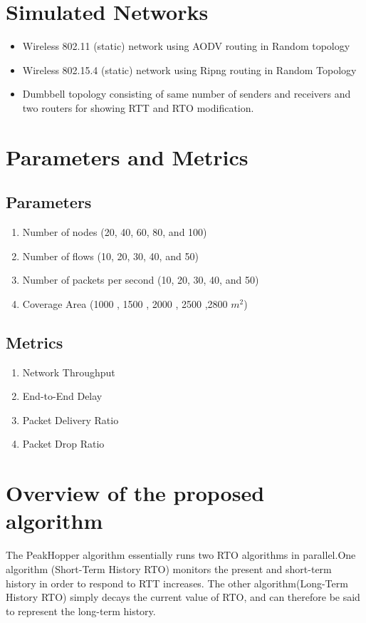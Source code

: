 \documentclass{article}[12pt]
\begin{document}
\section{Simulated Networks}
\begin{itemize}
    \item Wireless 802.11 (static) network using AODV routing in Random topology
    \item Wireless 802.15.4 (static) network using Ripng routing in Random Topology
    \item Dumbbell topology consisting of same number of senders and receivers and two routers for showing RTT and RTO modification.
  
\end{itemize}
    
\section{Parameters and Metrics}
    \subsection{Parameters}
        \begin{enumerate}
            \item Number of nodes (20, 40, 60, 80, and 100)
            \item Number of flows  (10, 20, 30, 40, and 50)
            \item Number of packets per second  (10, 20, 30, 40, and 50)
            \item Coverage Area (1000 , 1500 , 2000 , 2500  ,2800 $m^2$) 
        \end{enumerate}

    \subsection{Metrics}
        \begin{enumerate}
            \item Network Throughput
            \item End-to-End Delay
            \item Packet Delivery Ratio 
            \item Packet Drop Ratio
        \end{enumerate}


\section{Overview of the proposed algorithm}
The PeakHopper algorithm essentially runs two RTO algorithms in parallel.One algorithm (Short-Term History RTO) monitors the present and short-term history in order to respond to RTT increases. The other algorithm(Long-Term History RTO) simply decays the current value of RTO, and can therefore be said to represent the long-term history.\\
\end{document}
